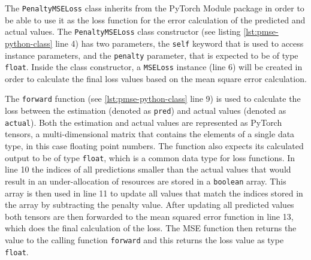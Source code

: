   The \texttt{PenaltyMSELoss} class inherits from the PyTorch Module package in order to be able to use it as the loss function for the error calculation of the predicted and actual values.
  The \texttt{PenaltyMSELoss} class constructor (see listing \ref{lst:pmse-python-class} line 4) has two parameters, the \texttt{self} keyword that is used to access instance parameters, and the \texttt{penalty} parameter, that is expected to be of type \texttt{float}.
  Inside the class constructor, a \texttt{MSELoss} instance (line 6) will be created in order to calculate the final loss values based on the mean square error calculation.

  

  The \texttt{forward} function (see \ref{lst:pmse-python-class} line 9) is used to calculate the loss between the estimation (denoted as \texttt{pred}) and actual values (denoted as \texttt{actual}). Both the estimation and actual values are represented as PyTorch tensors, a multi-dimensional matrix that contains the elements of a single data type, in this case floating point numbers.
  The function also expects its calculated output to be of type \texttt{float}, which is a common data type for loss functions.
  In line 10 the indices of all predictions smaller than the actual values that would result in an under-allocation of resources are stored in a \texttt{boolean} array.
  This array is then used in line 11 to update all values that match the indices stored in the array by subtracting the penalty value.
  After updating all predicted values both tensors are then forwarded to the mean squared error function in line 13, which does the final calculation of the loss.
  The MSE function then returns the value to the calling function \texttt{forward} and this returns the loss value as type \texttt{float}.




